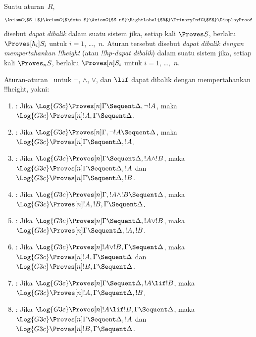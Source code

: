 \documentclass[../../../include/open-logic-section]{subfiles}
\begin{document}


\begin{defn}
Suatu aturan~$R$,
\[
\AxiomC{$S_1$}
\AxiomC{$\dots$}
\AxiomC{$S_n$}
\RightLabel{$R$}
\TrinaryInfC{$S$}
\DisplayProof
\]
disebut \emph{dapat dibalik} dalam suatu sistem jika, setiap kali
$\Proves S$, berlaku $\Proves[h_i] S_i$ untuk $i = 1$, \dots,~$n$.
Aturan tersebut disebut \emph{dapat dibalik dengan mempertahankan
!!{height}} (atau \emph{!!{hp}-dapat dibalik}) dalam suatu sistem jika,
setiap kali $\Proves_n S$, berlaku $\Proves[n] S_i$ untuk $i = 1$,
\dots,~$n$.
\end{defn}

\begin{lem}
Aturan-aturan~ untuk $\lnot$, $\land$, $\lor$, dan $\lif$
dapat dibalik dengan mempertahankan !!{height}, yakni:
\begin{enumerate}
  \item \RightR{\lnot}: Jika $\Log{G3c} \Proves[n] \Gamma \Sequent
  \Delta, \lnot !A$, maka $\Log{G3c} \Proves[n] !A, \Gamma \Sequent
  \Delta$.
  \item \LeftR{\lnot}: Jika $\Log{G3c} \Proves[n] \Gamma, \lnot !A
  \Sequent \Delta$, maka $\Log{G3c} \Proves[n] \Gamma \Sequent \Delta,
  !A$.
  \item \RightR{\land}: Jika $\Log{G3c} \Proves[n] \Gamma \Sequent
  \Delta, !A \land !B$, maka $\Log{G3c} \Proves[n] \Gamma \Sequent
  \Delta, !A$ dan $\Log{G3c} \Proves[n] \Gamma \Sequent
  \Delta, !B$.
  \item \LeftR{\land}: Jika $\Log{G3c} \Proves[n] \Gamma, !A \land !B
  \Sequent \Delta$, maka $\Log{G3c} \Proves[n] !A, !B, \Gamma \Sequent
  \Delta$.
  \item \RightR{\lor}: Jika $\Log{G3c} \Proves[n] \Gamma \Sequent
  \Delta, !A \lor !B$, maka $\Log{G3c} \Proves[n] \Gamma \Sequent
  \Delta, !A, !B$.
  \item \LeftR{\lor}: Jika $\Log{G3c} \Proves[n] !A \lor !B, \Gamma \Sequent
  \Delta$, maka $\Log{G3c} \Proves[n] !A, \Gamma \Sequent
  \Delta$ dan $\Log{G3c} \Proves[n] !B, \Gamma \Sequent
  \Delta$.
  \item \RightR{\lif}: Jika $\Log{G3c} \Proves[n] \Gamma \Sequent
  \Delta, !A \lif !B$, maka $\Log{G3c} \Proves[n] !A, \Gamma \Sequent
  \Delta, !B$.
  \item \LeftR{\lif}: Jika $\Log{G3c} \Proves[n] !A \lif !B, \Gamma
  \Sequent \Delta$, maka $\Log{G3c} \Proves[n] \Gamma \Sequent \Delta,
  !A$ dan $\Log{G3c} \Proves[n] !B, \Gamma \Sequent \Delta$.
\end{enumerate}
\end{lem}
\end{document}
